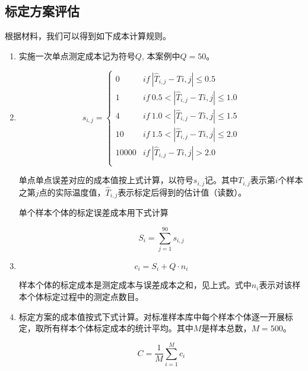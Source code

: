 \documentclass[10.5pt,twocolumn]{jbuaa}
\begin{document}
\subsection{标定方案评估}
根据材料，我们可以得到如下成本计算规则。
\begin{enumerate}[label=(\roman*)]
	\item {} 
	
		\normalfont 实施一次单点测定成本记为符号$Q$, 本案例中$Q = 50$。
	\item {}
	\normalfont
	\begin{displaymath}
			s_{i, j}=
		\begin{cases}
			0 & if\ |\hat T_{i, j} - T{i, j}| \leq 0.5 \\
			1 & if\ 0.5 < |\hat T_{i, j} - T{i, j}| \leq 1.0 \\
			4 & if\ 1.0 < |\hat T_{i, j} - T{i, j}| \leq 1.5 \\
			10 & if\ 1.5 < |\hat T_{i, j} - T{i, j}| \leq 2.0 \\
			10000 & if\ |\hat T_{i, j} - T{i, j}| > 2.0 \\
		\end{cases}
	\end{displaymath} 
	
	单点单点误差对应的成本值按上式计算，以符号$s_{i, j}$记。其中$T_{i, j}$表示第$i$个样本之第$j$点的实际温度值，$\hat T_{i, j}$表示标定后得到的估计值（读数）。
	
	单个样本个体的标定误差成本用下式计算
	
	\begin{displaymath}
		S_i = \sum_{j=1}^{90}s_{i, j}
	\end{displaymath}
	
	\item {}
	\normalfont
	\begin{displaymath}
		c_i = S_i + Q \cdot n_i
	\end{displaymath}
	
	样本个体的标定成本是测定成本与误差成本之和，见上式。式中$n_i$表示对该样本个体标定过程中的测定点数目。
	\item {}
	\normalfont
	标定方案的成本值按式下式计算。对标准样本库中每个样本个体逐一开展标定，取所有样本个体标定成本的统计平均。其中$M$是样本总数，$M = 500$。
	
	\begin{displaymath}
		C = \dfrac{1}{M}\sum_{i=1}^{M} c_i
	\end{displaymath}
\end{enumerate}
\end{document}
